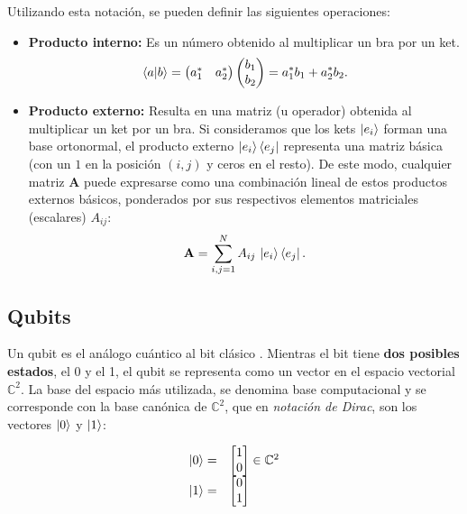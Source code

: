 Utilizando esta notación, se pueden definir las siguientes operaciones:

\begin{itemize}
    \item \textbf{Producto interno:} Es un número obtenido al multiplicar un bra por un ket.
          \[ \braket{a|b} = \begin{pmatrix} a_1^{*} & a_2^{*} \end{pmatrix} \begin{pmatrix} b_1\\ b_2 \end{pmatrix} = a_1^{*} b_1 + a_2^{*} b_2. \]
    \item \textbf{Producto externo:} Resulta en una matriz (u operador) obtenida al multiplicar un ket por un bra. Si consideramos que los kets $\ket{e_i}$ forman una base ortonormal, el producto externo $\ket{e_i}\bra{e_j}$ representa una matriz básica (con un $1$ en la posición $(i,j)$ y ceros en el resto). De este modo, cualquier matriz $\mathbf{A}$ puede expresarse como una combinación lineal de estos productos externos básicos, ponderados por sus respectivos elementos matriciales (escalares) $A_{ij}$:
          \[ \mathbf{A} = \sum_{i,j=1}^{N} A_{ij}\,\ket{e_i}\bra{e_j}. \]
\end{itemize}


\subsection{Qubits}
\label{chap:qubits}

Un \gls{qubit} es el análogo cuántico al bit clásico \cite{ionos_qubits_2023}. Mientras el bit tiene \textbf{dos posibles estados}, el 0 y el 1, el \gls{qubit} se representa como un vector en el espacio vectorial $\mathbb{C}^2$. La base del espacio más utilizada, se denomina base computacional y se corresponde con la base canónica de $\mathbb{C}^2$, que en \textit{notación de Dirac}, son los vectores $\ket{0}$ y $\ket{1}$:

\begin{equation*}
    \begin{array}{rl}
        \ket{0} = & \begin{bmatrix}
                        1 \\ 0
                    \end{bmatrix} \in \mathbb{C}^2 \\
        \ket{1} = & \begin{bmatrix}
                        0 \\ 1
                    \end{bmatrix}
    \end{array}
\end{equation*}

